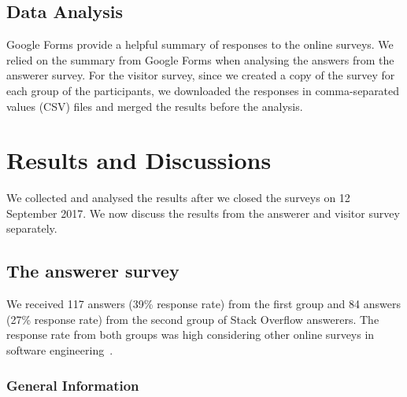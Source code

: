 \documentclass{svjour3}                     %
\begin{document}
\subsection{Data Analysis}
Google Forms provide a helpful summary of responses to the online surveys. We
relied on the summary from Google Forms when analysing the answers from the
answerer survey. For the visitor survey, since we created a copy of the survey for each
group of the participants, we downloaded the responses in comma-separated values
(CSV) files and merged the results before the analysis.

\section{Results and Discussions}
We collected and analysed the results after we closed the surveys on 12
September 2017. We now discuss the results from the answerer and
visitor survey separately.

\subsection{The answerer survey}
We received 117 answers (39\% response rate) from the first group and 84 answers
(27\% response rate) from the second group of Stack Overflow answerers. The response
rate from both groups was high considering other online surveys in software
engineering~\citep{Punter2003}.

\subsubsection{General Information}

\end{document}
